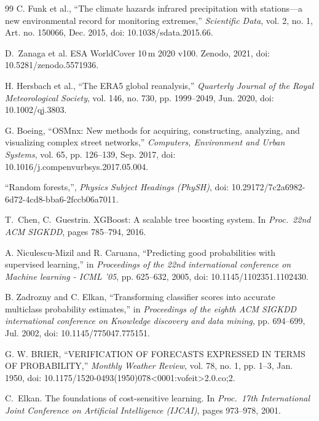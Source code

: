 \documentclass[10pt,twocolumn]{article}
\begin{document}
{\begin{thebibliography}{99}
C. Funk et al., ``The climate hazards infrared precipitation with stations---a new environmental record for monitoring extremes,'' \emph{Scientific Data}, vol. 2, no. 1, Art. no. 150066, Dec. 2015, doi: 10.1038/sdata.2015.66.

D.~Zanaga et al. ESA WorldCover 10\,m 2020 v100. Zenodo, 2021, doi: 10.5281/zenodo.5571936.

H. Hersbach et al., ``The ERA5 global reanalysis,'' \emph{Quarterly Journal of the Royal Meteorological Society}, vol. 146, no. 730, pp. 1999--2049, Jun. 2020, doi: 10.1002/qj.3803.

G. Boeing, ``OSMnx: New methods for acquiring, constructing, analyzing, and visualizing complex street networks,'' \emph{Computers, Environment and Urban Systems}, vol. 65, pp. 126--139, Sep. 2017, doi: 10.1016/j.compenvurbsys.2017.05.004.

``Random forests,'', \emph{Physics Subject Headings (PhySH)}, doi: 10.29172/7c2a6982-6d72-4cd8-bba6-2fccb06a7011.

T.~Chen, C.~Guestrin. XGBoost: A scalable tree boosting system. In \emph{Proc.\ 22nd ACM SIGKDD}, pages 785--794, 2016.

A. Niculescu-Mizil and R. Caruana, ``Predicting good probabilities with supervised learning,'' in \emph{Proceedings of the 22nd international conference on Machine learning - ICML '05}, pp. 625--632, 2005, doi: 10.1145/1102351.1102430.

B. Zadrozny and C. Elkan, ``Transforming classifier scores into accurate multiclass probability estimates,'' in \emph{Proceedings of the eighth ACM SIGKDD international conference on Knowledge discovery and data mining}, pp. 694--699, Jul. 2002, doi: 10.1145/775047.775151.

G. W. BRIER, ``VERIFICATION OF FORECASTS EXPRESSED IN TERMS OF PROBABILITY,'' \emph{Monthly Weather Review}, vol. 78, no. 1, pp. 1--3, Jan. 1950, doi: 10.1175/1520-0493(1950)078<0001:vofeit>2.0.co;2.

C.~Elkan. The foundations of cost-sensitive learning. In \emph{Proc.\ 17th International Joint Conference on Artificial Intelligence (IJCAI)}, pages 973--978, 2001.


\end{thebibliography}}
\end{document}
